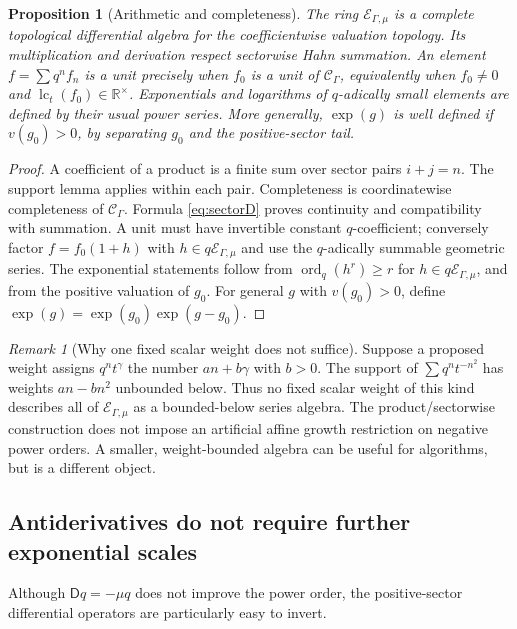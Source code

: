 \documentclass[11pt,a4paper]{article}
\newtheorem{proposition}[theorem]{Proposition}
\theoremstyle{definition}
\theoremstyle{remark}
\newtheorem{remark}[theorem]{Remark}
\newcommand{\R}{\mathbb R}
\newcommand{\C}{\mathcal C_\Gamma}
\newcommand{\E}{\mathcal E_{\Gamma,\mu}}
\newcommand{\lc}{\operatorname{lc}_t}
\newcommand{\ordq}{\operatorname{ord}_q}
\newcommand{\D}{\mathsf D}
\begin{document}
\begin{proposition}[Arithmetic and completeness]\label{prop:sectoralg}
The ring $\E$ is a complete topological differential algebra for the
coefficientwise valuation topology. Its multiplication and derivation
respect sectorwise Hahn summation. An element $f=\sum q^nf_n$ is a unit
precisely when $f_0$ is a unit of $\C$, equivalently when $f_0\ne0$ and
$\lc(f_0)\in\R^\times$. Exponentials and logarithms of $q$-adically small
elements are defined by their usual power series. More generally,
$\exp(g)$ is well defined if $v(g_0)>0$, by separating $g_0$ and the
positive-sector tail.
\end{proposition}
\begin{proof}
A coefficient of a product is a finite sum over sector pairs $i+j=n$.
The support lemma applies within each pair. Completeness is coordinatewise
completeness of $\C$. Formula \eqref{eq:sectorD} proves continuity and
compatibility with summation. A unit must have invertible constant
$q$-coefficient; conversely factor $f=f_0(1+h)$ with $h\in q\E$ and use the
$q$-adically summable geometric series. The exponential statements follow
from $\ordq(h^r)\ge r$ for $h\in q\E$, and from the positive valuation of
$g_0$. For general $g$ with $v(g_0)>0$, define
$\exp(g)=\exp(g_0)\exp(g-g_0)$.
\end{proof}

\begin{remark}[Why one fixed scalar weight does not suffice]
Suppose a proposed weight assigns $q^nt^\gamma$ the number $an+b\gamma$
with $b>0$. The support of $\sum q^nt^{-n^2}$ has weights
$an-bn^2$ unbounded below. Thus no fixed scalar weight of this kind describes
all of $\E$ as a bounded-below series algebra. The product/sectorwise
construction does not impose an artificial affine growth restriction on
negative power orders. A smaller, weight-bounded algebra can be useful for
algorithms, but is a different object.
\end{remark}

\subsection{Antiderivatives do not require further exponential scales}
Although $\D q=-\mu q$ does not improve the power order, the positive-sector
differential operators are particularly easy to invert.
\end{document}
